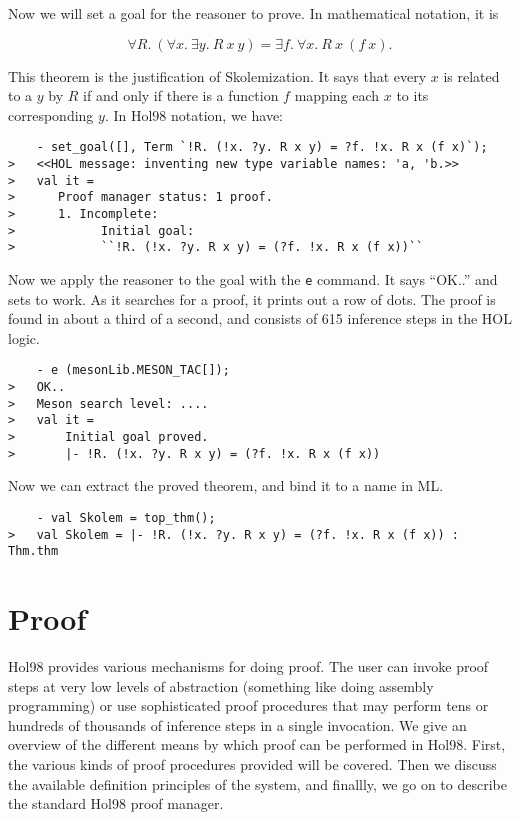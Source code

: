 \documentclass[12pt,fleqn,a4paper]{report}
\begin{document}
Now we will set a goal for the reasoner to prove. In mathematical
notation, it is

\[\forall R.\ (\forall x.\  \exists y.\ R\ x\ y) = \exists f.\ \forall
 x.\ R\ x\ (f\ x).\]

 This theorem is the justification of Skolemization. It says that
every $x$ is related to a $y$ by $R$ if and only if there is
a function $f$ mapping each $x$ to its corresponding $y$. In Hol98
notation, we have:
\begin{verbatim}
    - set_goal([], Term `!R. (!x. ?y. R x y) = ?f. !x. R x (f x)`);
>   <<HOL message: inventing new type variable names: 'a, 'b.>>
>   val it =
>      Proof manager status: 1 proof.
>      1. Incomplete:
>            Initial goal:
>            ``!R. (!x. ?y. R x y) = (?f. !x. R x (f x))``
\end{verbatim}

Now we apply the reasoner to the goal with the \verb+e+ command. It says
``OK..'' and sets to work. As it searches for a proof, it prints out a
row of dots. The proof is found in about a third of a second, and
consists of 615 inference steps in the HOL logic.
\begin{verbatim}
    - e (mesonLib.MESON_TAC[]);
>   OK..
>   Meson search level: ....
>   val it =
>       Initial goal proved.
>       |- !R. (!x. ?y. R x y) = (?f. !x. R x (f x))
\end{verbatim}

Now we can extract the proved theorem, and
bind it to a name in ML.
\begin{verbatim}
    - val Skolem = top_thm();
>   val Skolem = |- !R. (!x. ?y. R x y) = (?f. !x. R x (f x)) : Thm.thm
\end{verbatim}

\chapter{Proof}

 Hol98 provides various mechanisms for doing proof. The user can invoke
 proof steps at very low levels of abstraction (something like doing
 assembly programming) or use sophisticated proof procedures that may
 perform tens or hundreds of thousands of inference steps in a single
 invocation. We give an overview of the different means by which proof
 can be performed in Hol98. First, the various kinds of proof procedures
 provided will be covered. Then we discuss the available definition
 principles of the system, and finallly, we go on to describe the
 standard Hol98 proof manager.
\end{document}
